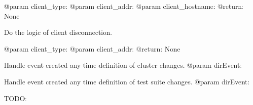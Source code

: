 \documentclass[a4paper,11pt,openany]{sphinxmanual}
\begin{document}
\begin{fulllineitems}
\begin{fulllineitems}
@param client\_type:
@param client\_addr:
@param client\_hostname:
@return: None

\end{fulllineitems}


\begin{fulllineitems}
\label{ref-manual/XrdTestMaster:XrdTestMaster.XrdTestMaster.handleClientDisconnected}
Do the logic of client disconnection.

@param client\_type:
@param client\_addr:
@return: None

\end{fulllineitems}


\begin{fulllineitems}
\label{ref-manual/XrdTestMaster:XrdTestMaster.XrdTestMaster.handleClusterDefinitionChanged}
Handle event created any time definition of cluster changes.
@param dirEvent:

\end{fulllineitems}


\begin{fulllineitems}
\label{ref-manual/XrdTestMaster:XrdTestMaster.XrdTestMaster.handleSuiteDefinitionChanged}
Handle event created any time definition of test suite changes.
@param dirEvent:

\end{fulllineitems}


\begin{fulllineitems}
\label{ref-manual/XrdTestMaster:XrdTestMaster.XrdTestMaster.handleTagRequest}
TODO:

\end{fulllineitems}



\end{fulllineitems}
\end{document}
